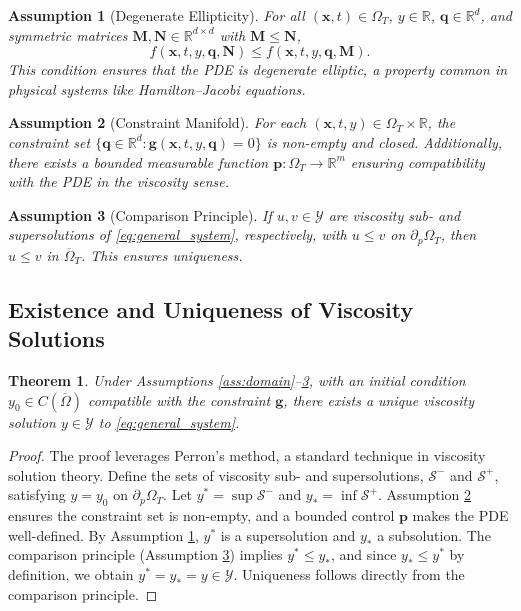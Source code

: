 \documentclass[pdflatex,sn-mathphys-num]{sn-jnl}%
\theoremstyle{thmstyleone}%
\newtheorem{thm}{Theorem}[section]
\newtheorem{assum}{Assumption}[section]
\numberwithin{equation}{section}
\begin{document}
\begin{assum}[Degenerate Ellipticity]
\label{ass:ellipticity}
For all \( (\bm{x}, t) \in \Omega_T \), \( y \in \mathbb{R} \), \( \bm{q} \in \mathbb{R}^d \), and symmetric matrices \( \bm{M}, \bm{N} \in \mathbb{R}^{d \times d} \) with \( \bm{M} \leq \bm{N} \),
\[
f(\bm{x}, t, y, \bm{q}, \bm{N}) \leq f(\bm{x}, t, y, \bm{q}, \bm{M}).
\]
This condition ensures that the PDE is degenerate elliptic, a property common in physical systems like Hamilton--Jacobi equations.
\end{assum}

\begin{assum}[Constraint Manifold]
\label{ass:manifold}
For each \( (\bm{x}, t, y) \in \Omega_T \times \mathbb{R} \), the constraint set \( \{ \bm{q} \in \mathbb{R}^d : \bm{g}(\bm{x}, t, y, \bm{q}) = 0 \} \) is non-empty and closed. Additionally, there exists a bounded measurable function \( \bm{p}: \Omega_T \to \mathbb{R}^m \) ensuring compatibility with the PDE in the viscosity sense.
\end{assum}

\begin{assum}[Comparison Principle]
\label{ass:comparison}
If \( u, v \in \mathcal{Y} \) are viscosity sub- and supersolutions of \eqref{eq:general_system}, respectively, with \( u \leq v \) on \( \partial_p \Omega_T \), then \( u \leq v \) in \( \overline{\Omega}_T \). This ensures uniqueness.
\end{assum}

\subsection{Existence and Uniqueness of Viscosity Solutions}

\begin{thm}
\label{thm:existence_uniqueness}
Under Assumptions \ref{ass:domain}--\ref{ass:comparison}, with an initial condition \( y_0 \in C(\overline{\Omega}) \) compatible with the constraint \( \bm{g} \), there exists a unique viscosity solution \( y \in \mathcal{Y} \) to \eqref{eq:general_system}.
\end{thm}

\begin{proof}
The proof leverages Perron’s method, a standard technique in viscosity solution theory. Define the sets of viscosity sub- and supersolutions, \( \mathcal{S}^- \) and \( \mathcal{S}^+ \), satisfying \( y = y_0 \) on \( \partial_p \Omega_T \). Let \( y^* = \sup \mathcal{S}^- \) and \( y_* = \inf \mathcal{S}^+ \). Assumption \ref{ass:manifold} ensures the constraint set is non-empty, and a bounded control \( \bm{p} \) makes the PDE well-defined. By Assumption \ref{ass:ellipticity}, \( y^* \) is a supersolution and \( y_* \) a subsolution. The comparison principle (Assumption \ref{ass:comparison}) implies \( y^* \leq y_* \), and since \( y_* \leq y^* \) by definition, we obtain \( y^* = y_* = y \in \mathcal{Y} \). Uniqueness follows directly from the comparison principle.
\end{proof}
\end{document}

